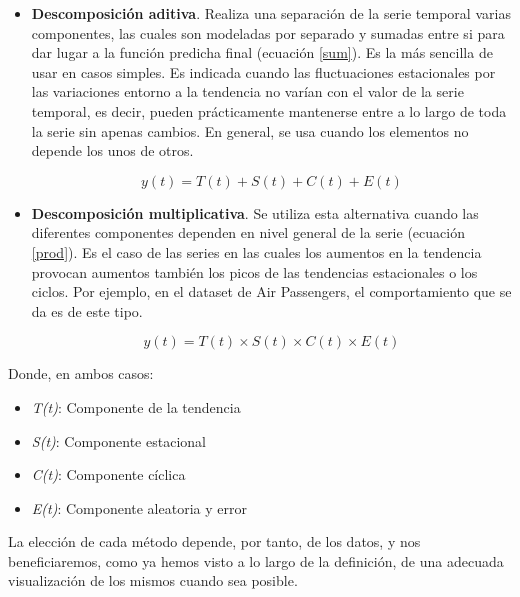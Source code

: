 \begin{itemize}
	\item \textbf{Descomposición aditiva}. Realiza una separación de la serie temporal varias componentes, las cuales son modeladas por separado y sumadas entre si para dar lugar a la función predicha final (ecuación \ref{sum}). Es la más sencilla de usar en casos simples. Es indicada cuando las fluctuaciones estacionales por las variaciones entorno a la tendencia no varían con el valor de la serie temporal, es decir, pueden prácticamente mantenerse entre a lo largo de toda la serie sin apenas cambios. En general, se usa cuando los elementos no depende los unos de otros.
	
	\begin{equation}
	y(t) = T(t) + S(t) + C(t) + E(t)
	\label{sum}
	\end{equation}

	\item \textbf{Descomposición multiplicativa}. Se utiliza esta alternativa cuando las diferentes componentes dependen en nivel general de la serie (ecuación \ref{prod}). Es el caso de las series en las cuales los aumentos en la tendencia provocan aumentos también los picos de las tendencias estacionales o los ciclos.  Por ejemplo, en el dataset de Air Passengers, el comportamiento que se da es de este tipo.
	
	\begin{equation}
		y(t) = T(t) \times S(t) \times C(t) \times E(t)
		\label{prod}
	\end{equation}
	
\end{itemize}

Donde, en ambos casos:

\begin{itemize}
	\item \textit{T(t)}: Componente de la tendencia
	
	\item \textit{S(t)}: Componente estacional
	
	\item \textit{C(t)}: Componente cíclica
	
	\item \textit{E(t)}: Componente aleatoria y error
\end{itemize}

La elección de cada método depende, por tanto, de los datos, y nos beneficiaremos, como ya hemos visto a lo largo de la definición, de una adecuada visualización de los mismos cuando sea posible.

